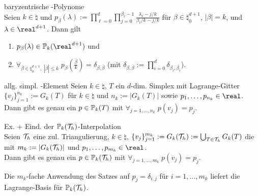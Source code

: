 \linie

\begin{Lemma}{baryzentrische -Polynome}\\
    Seien $k \in \natural$ und
    $p_\beta(\lambda) := \prod_{\ell=0}^d \prod_{j=0}^{\beta_\ell-1}
    \frac{\lambda_\ell - j/k}{\beta_\ell/k - j/k}$
    für $\beta \in \natural_0^{d+1}$, $|\beta| = k$, und $\lambda \in \real^{d+1}$.
    Dann gilt
    \begin{enumerate}
        \item
        $p_\beta(\lambda) \in \PP_k(\real^{d+1})$ und

        \item
        $\forall_{\overline{\beta} \in \natural_0^{d+1},\; |\overline{\beta}| \le k}\;
        p_\beta(\frac{\overline{\beta}}{k}) = \delta_{\beta,\overline{\beta}}$
        (mit $\delta_{\beta,\overline{\beta}} :=
        \prod_{i=0}^d \delta_{\beta_i,\overline{\beta_i}}$).
    \end{enumerate}
\end{Lemma}

\begin{Satz}{allg. simpl. -Element}
    Seien $k \in \natural$,
    $T$ ein $d$-dim. Simplex mit Lagrange-Gitter
    $\{v_j\}_{j=1}^{n_k} := G_k(T)$ für
    $k \in \natural$ und $n_k := |G_k(T)|$ sowie $p_1, \dotsc, p_{n_k} \in \real$.\\
    Dann gibt es genau ein $p \in \mathbb{P}_k(T)$ mit $\forall_{j=1,\dotsc,n_k}\; p(v_j) = p_j$.
\end{Satz}

\linie

\begin{Satz}{Ex. + Eind. der $\mathbb{P}_k(\mathcal{T}_h)$-Interpolation}\\
    Seien $\mathcal{T}_h$ eine zul. Triangulierung,
    $k \in \natural$,
    $\{v_j\}_{j=1}^{m_k} := G_k(\mathcal{T}_h) := \bigcup_{T \in \mathcal{T}_h} G_k(T)$
    die  mit
    $m_k := |G_k(\mathcal{T}_h)|$ und
    $p_1, \dotsc, p_{m_k} \in \real$.\\
    Dann gibt es genau ein $p \in \mathbb{P}_k(\mathcal{T}_h)$ mit
    $\forall_{j=1,\dotsc,m_k}\; p(v_j) = p_j$.
\end{Satz}

\linie

\begin{Bem}
    Die $m_k$-fache Anwendung des Satzes auf $p_j = \delta_{i,j}$ für
    $i = 1, \dotsc, m_k$ liefert die Lagrange-Basis für $\mathbb{P}_k(\mathcal{T}_h)$.
\end{Bem}

